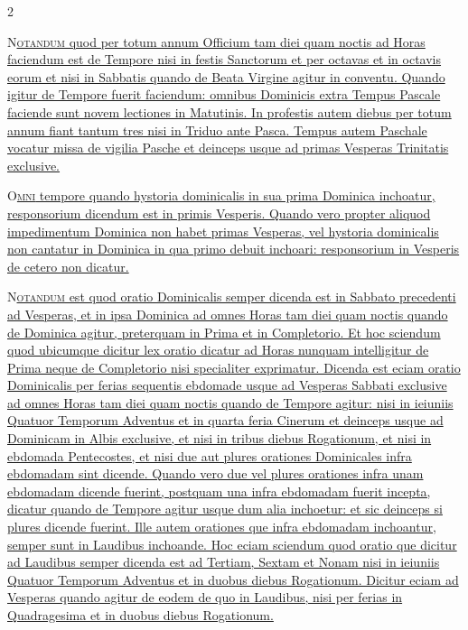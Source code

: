 

\thispagestyle{fancy}
\fancyhead[RO,LE]{\rightmark}

\begin{multicols*}{2}

{\color{Red} }
\lettrine[lines=3]{\zallmancaps \color{Blue} N}{}\ul{\textsc{otandum} quod per totum annum Officium tam diei quam noctis ad Horas faciendum est de Tempore nisi in festis Sanctorum et per octavas et in octavis eorum et nisi in Sabbatis quando de Beata Virgine agitur in conventu.
\newline Quando igitur de Tempore fuerit faciendum: omnibus Dominicis extra Tempus Pascale faciende sunt novem lectiones in Matutinis. In profestis autem diebus per totum annum fiant tantum tres nisi in Triduo ante Pasca. Tempus autem Paschale vocatur missa de vigilia Pasche et deinceps usque ad primas Vesperas Trinitatis exclusive.}

{\color{Red} }
\lettrine[lines=2]{\zallmancaps \color{Red} O}{}\ul{\textsc{mni} tempore quando hystoria dominicalis in sua prima Dominica inchoatur, responsorium dicendum est in primis Vesperis. Quando vero propter aliquod impedimentum Dominica non habet primas Vesperas, vel hystoria dominicalis non cantatur in Dominica in qua primo debuit inchoari: responsorium in Vesperis de cetero non dicatur.}

{\color{Red} }
\lettrine[lines=2]{\zallmancaps \color{Blue} N}{}\ul{\textsc{otandum} est quod oratio Dominicalis semper dicenda est in Sabbato precedenti ad Vesperas, et in ipsa Dominica ad omnes Horas tam diei quam noctis quando de Dominica agitur, preterquam in Prima et in Completorio. Et hoc sciendum quod ubicumque dicitur lex oratio dicatur ad Horas nunquam intelligitur de Prima neque de Completorio nisi specialiter exprimatur. Dicenda est eciam oratio Dominicalis per ferias sequentis ebdomade usque ad Vesperas Sabbati exclusive ad omnes Horas tam diei quam noctis quando de Tempore agitur: nisi in ieiuniis Quatuor Temporum Adventus et in quarta feria Cinerum et deinceps usque ad Dominicam in Albis exclusive, et nisi in tribus diebus Rogationum, et nisi in ebdomada Pentecostes, et nisi due aut plures orationes Dominicales infra ebdomadam sint dicende. Quando vero due vel plures orationes infra unam ebdomadam dicende fuerint, postquam una infra ebdomadam fuerit incepta, dicatur quando de Tempore agitur usque dum alia inchoetur: et sic deinceps si plures dicende fuerint.
Ille autem orationes que infra ebdomadam inchoantur, semper sunt in Laudibus inchoande. Hoc eciam sciendum quod oratio que dicitur ad Laudibus semper dicenda est ad Tertiam, Sextam et Nonam nisi in ieiuniis Quatuor Temporum Adventus et in duobus diebus Rogationum. Dicitur eciam ad Vesperas quando agitur de eodem de quo in Laudibus, nisi per ferias in Quadragesima et in duobus diebus Rogationum.}


\end{multicols*}
